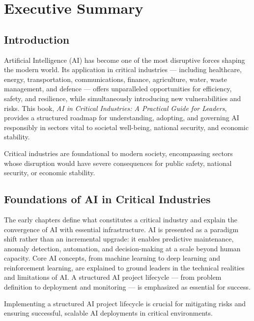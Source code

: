 \chapter{Executive Summary}
\label{chap:executive_summary}

\section*{Introduction}
Artificial Intelligence (AI) has become one of the most disruptive forces shaping the modern world. 
Its application in critical industries --- including healthcare, energy, transportation, communications, finance, agriculture, water, waste management, and defence --- 
offers unparalleled opportunities for efficiency, safety, and resilience, while simultaneously introducing new vulnerabilities and risks. 
This book, \emph{AI in Critical Industries: A Practical Guide for Leaders}, provides a structured roadmap for understanding, adopting, 
and governing AI responsibly in sectors vital to societal well-being, national security, and economic stability. 

\begin{notebox}
Critical industries are foundational to modern society, encompassing sectors whose disruption would have severe consequences for public safety, national security, or economic stability.
\end{notebox} 

\section*{Foundations of AI in Critical Industries}
The early chapters define what constitutes a critical industry and explain the convergence of AI with essential infrastructure. 
AI is presented as a paradigm shift rather than an incremental upgrade: it enables predictive maintenance, anomaly detection, 
automation, and decision-making at a scale beyond human capacity. Core AI concepts, from machine learning to deep learning and 
reinforcement learning, are explained to ground leaders in the technical realities and limitations of AI. A structured AI project 
lifecycle --- from problem definition to deployment and monitoring --- is emphasized as essential for success.
\begin{tipbox}
Implementing a structured AI project lifecycle is crucial for mitigating risks and ensuring successful, scalable AI deployments in critical environments.
\end{tipbox}

